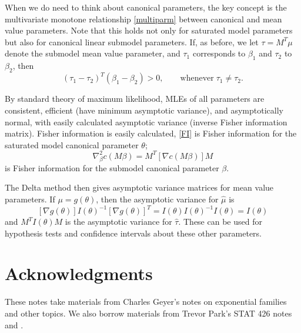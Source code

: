 \documentclass[12pt]{article}
\begin{document}
When we do need to think about canonical parameters, the key concept is the multivariate monotone relationship \eqref{multiparm} between canonical and mean value parameters. Note that this holds not only for saturated model parameters but also for canonical linear submodel parameters. If, as before, we let $\tau = M^T\mu$ denote the submodel mean value parameter, and $\tau_1$ corresponds to $\beta_1$ and $\tau_2$ to $\beta_2$, then
$$
  (\tau_1 - \tau_2)^T(\beta_1 - \beta_2) > 0, \qquad \text{whenever} \; \tau_1 \neq \tau_2.
$$

By standard theory of maximum likelihood, MLEs of all parameters are consistent, efficient (have minimum asymptotic variance), and asymptotically normal, with easily calculated asymptotic variance (inverse Fisher information matrix). Fisher information is easily calculated, \eqref{FI} is Fisher information for the saturated model canonical parameter $\theta$;
$$
  \nabla^2_\beta c(M\beta) = M^T\left[\nabla c(M\beta)\right]M
$$
is Fisher information for the submodel canonical parameter $\beta$.

The Delta method then gives asymptotic variance matrices for mean value parameters. If $\mu = g(\theta)$, then the asymptotic variance for $\hat\mu$ is
$$
  [\nabla g(\theta)]I(\theta)^{-1}[\nabla g(\theta)]^T = I(\theta)I(\theta)^{-1}I(\theta) = I(\theta)
$$
and $M^TI(\theta)M$ is the asymptotic variance for $\hat\tau$. These can be used for hypothesis tests and confidence intervals about these other parameters.



\section*{Acknowledgments}
These notes take materials from Charles Geyer's notes on exponential families and other topics. We also borrow materials from Trevor Park's STAT 426 notes and \cite{agresti2013cat}.





\end{document}
